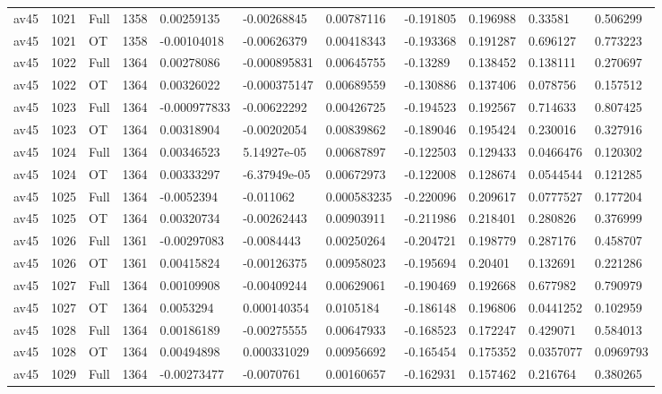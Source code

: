 \begin{landscape}
\begin{longtable}{lllllllllll}
av45 & 1021 & Full & 1358 & 0.00259135 & -0.00268845 & 0.00787116 & -0.191805 & 0.196988 & 0.33581 & 0.506299 \\
av45 & 1021 & OT & 1358 & -0.00104018 & -0.00626379 & 0.00418343 & -0.193368 & 0.191287 & 0.696127 & 0.773223 \\
av45 & 1022 & Full & 1364 & 0.00278086 & -0.000895831 & 0.00645755 & -0.13289 & 0.138452 & 0.138111 & 0.270697 \\
av45 & 1022 & OT & 1364 & 0.00326022 & -0.000375147 & 0.00689559 & -0.130886 & 0.137406 & 0.078756 & 0.157512 \\
av45 & 1023 & Full & 1364 & -0.000977833 & -0.00622292 & 0.00426725 & -0.194523 & 0.192567 & 0.714633 & 0.807425 \\
av45 & 1023 & OT & 1364 & 0.00318904 & -0.00202054 & 0.00839862 & -0.189046 & 0.195424 & 0.230016 & 0.327916 \\
av45 & 1024 & Full & 1364 & 0.00346523 & 5.14927e-05 & 0.00687897 & -0.122503 & 0.129433 & 0.0466476 & 0.120302 \\
av45 & 1024 & OT & 1364 & 0.00333297 & -6.37949e-05 & 0.00672973 & -0.122008 & 0.128674 & 0.0544544 & 0.121285 \\
av45 & 1025 & Full & 1364 & -0.0052394 & -0.011062 & 0.000583235 & -0.220096 & 0.209617 & 0.0777527 & 0.177204 \\
av45 & 1025 & OT & 1364 & 0.00320734 & -0.00262443 & 0.00903911 & -0.211986 & 0.218401 & 0.280826 & 0.376999 \\
av45 & 1026 & Full & 1361 & -0.00297083 & -0.0084443 & 0.00250264 & -0.204721 & 0.198779 & 0.287176 & 0.458707 \\
av45 & 1026 & OT & 1361 & 0.00415824 & -0.00126375 & 0.00958023 & -0.195694 & 0.20401 & 0.132691 & 0.221286 \\
av45 & 1027 & Full & 1364 & 0.00109908 & -0.00409244 & 0.00629061 & -0.190469 & 0.192668 & 0.677982 & 0.790979 \\
av45 & 1027 & OT & 1364 & 0.0053294 & 0.000140354 & 0.0105184 & -0.186148 & 0.196806 & 0.0441252 & 0.102959 \\
av45 & 1028 & Full & 1364 & 0.00186189 & -0.00275555 & 0.00647933 & -0.168523 & 0.172247 & 0.429071 & 0.584013 \\
av45 & 1028 & OT & 1364 & 0.00494898 & 0.000331029 & 0.00956692 & -0.165454 & 0.175352 & 0.0357077 & 0.0969793 \\
av45 & 1029 & Full & 1364 & -0.00273477 & -0.0070761 & 0.00160657 & -0.162931 & 0.157462 & 0.216764 & 0.380265 \\

\end{longtable}
\end{landscape}
